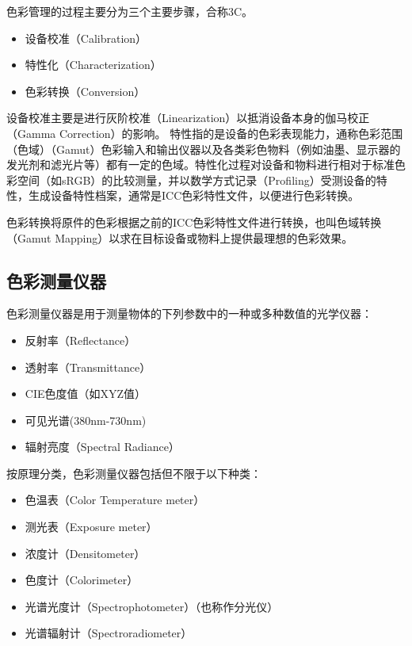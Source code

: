         色彩管理的过程主要分为三个主要步骤，合称3C。
        \begin{itemize}
            \item  设备校准（Calibration）
            \item  特性化（Characterization）
            \item  色彩转换（Conversion）
        \end{itemize}

        设备校准主要是进行灰阶校准（Linearization）以抵消设备本身的伽马校正（Gamma Correction）的影响。
    特性指的是设备的色彩表现能力，通称色彩范围（色域）（Gamut）色彩输入和输出仪器以及各类彩色物料（例如油墨、显示器的发光剂和滤光片等）都有一定的色域。特性化过程对设备和物料进行相对于标准色彩空间（如sRGB）的比较测量，并以数学方式记录（Profiling）受测设备的特性，生成设备特性档案，通常是ICC色彩特性文件，以便进行色彩转换。

        色彩转换将原件的色彩根据之前的ICC色彩特性文件进行转换，也叫色域转换（Gamut Mapping）以求在目标设备或物料上提供最理想的色彩效果。

\subsection {色彩测量仪器}

    色彩测量仪器是用于测量物体的下列参数中的一种或多种数值的光学仪器：
        \begin{itemize}
            \item  反射率（Reflectance）
            \item  透射率（Transmittance）
            \item  CIE色度值（如XYZ值）
            \item  可见光谱(380nm-730nm)
            \item  辐射亮度（Spectral Radiance）
        \end{itemize}

    按原理分类，色彩测量仪器包括但不限于以下种类：

        \begin{itemize}
            \item  色温表（Color Temperature meter）
            \item  测光表（Exposure meter）
            \item  浓度计（Densitometer）
            \item  色度计（Colorimeter）
            \item  光谱光度计（Spectrophotometer）（也称作分光仪）
            \item  光谱辐射计（Spectroradiometer）
        \end{itemize}

